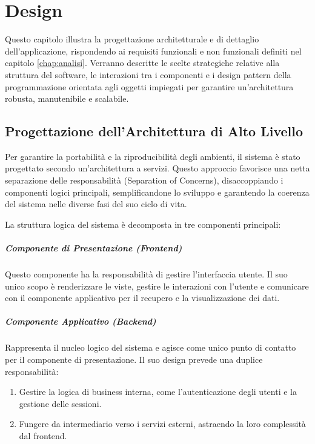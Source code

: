 \documentclass[12pt,a4paper,openright,twoside]{book}
\begin{document}
\chapter{Design}
\label{chap:design}

Questo capitolo illustra la progettazione architetturale e di dettaglio dell'applicazione, rispondendo ai requisiti funzionali e non funzionali definiti nel capitolo \ref{chap:analisi}. Verranno descritte le scelte strategiche relative alla struttura del software, le interazioni tra i componenti e i design pattern della programmazione orientata agli oggetti impiegati per garantire un'architettura robusta, manutenibile e scalabile.

\section{Progettazione dell'Architettura di Alto Livello}
\label{sec:design_architettura}

Per garantire la portabilità e la riproducibilità degli ambienti, il sistema è stato progettato secondo un'architettura a servizi. Questo approccio favorisce una netta separazione delle responsabilità (Separation of Concerns), disaccoppiando i componenti logici principali, semplificandone lo sviluppo e garantendo la coerenza del sistema nelle diverse fasi del suo ciclo di vita.

La struttura logica del sistema è decomposta in tre componenti principali:


\paragraph{Componente di Presentazione (Frontend)} Questo componente ha la responsabilità di gestire l'interfaccia utente. Il suo unico scopo è renderizzare le viste, gestire le interazioni con l'utente e comunicare con il componente applicativo per il recupero e la visualizzazione dei dati.

\paragraph{Componente Applicativo (Backend)} Rappresenta il nucleo logico del sistema e agisce come unico punto di contatto per il componente di presentazione. Il suo design prevede una duplice responsabilità:
\begin{enumerate}
    \item Gestire la logica di business interna, come l'autenticazione degli utenti e la gestione delle sessioni.
    \item Fungere da intermediario verso i servizi esterni, astraendo la loro complessità dal frontend.
\end{enumerate}
\end{document}

